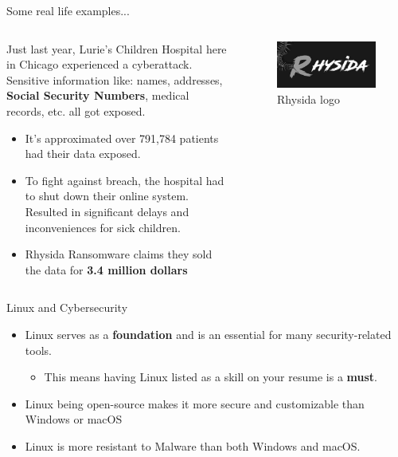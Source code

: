 \documentclass{beamer}
\begin{document}
\begin{frame}{Some real life examples...}
	\begin{columns}
		\begin{column}{0.5\textwidth}
			Just last year, Lurie's Children Hospital here in
			Chicago experienced a cyberattack. Sensitive
			information like: names, addresses, \textbf{Social
			Security Numbers}, medical records, etc. all got
			exposed.
			\pause

			\begin{itemize}
				\item It's approximated over 791,784 patients
					had their data exposed.
					\pause

				\item To fight against breach, the hospital had
					to shut down their online system.
					Resulted in significant delays and
					inconveniences for sick children.
					\pause

				\item Rhysida Ransomware claims they sold the
					data for \textbf{3.4 million dollars}
			\end{itemize}
		\end{column}
		\begin{column}{0.5\textwidth}
			\begin{figure}
				\centering
				\includegraphics[width=0.7\linewidth]{rhysida.jpeg}
				\caption{Rhysida logo}
			\end{figure}
		\end{column}
	\end{columns}
\end{frame}

\begin{frame}{Linux and Cybersecurity}
	\begin{itemize}
		\item Linux serves as a \textbf{foundation} and is an essential
			for many security-related tools.
			\begin{itemize}
				\item This means having Linux listed as a skill
					on your resume is a \textbf{must}.
			\end{itemize}
			\pause

			\item Linux being open-source makes it more secure and
				customizable than Windows or macOS
				\pause

			\item Linux is more resistant to Malware than both
				Windows and macOS.
	\end{itemize}
\end{frame}
\end{document}
